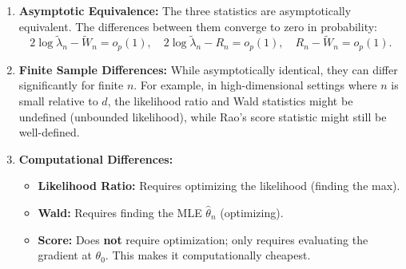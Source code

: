 \begin{remark}
    \leavevmode
\begin{enumerate}
    \item \textbf{Asymptotic Equivalence:} The three statistics are asymptotically equivalent. The differences between them converge to zero in probability:
    \[ 2\log \tilde{\lambda}_n - \widetilde{W}_n = o_p(1), \quad 2\log \tilde{\lambda}_n - R_n = o_p(1), \quad R_n - \widetilde{W}_n = o_p(1). \]
    \item \textbf{Finite Sample Differences:} While asymptotically identical, they can differ significantly for finite $n$. For example, in high-dimensional settings where $n$ is small relative to $d$, the likelihood ratio and Wald statistics might be undefined (unbounded likelihood), while Rao's score statistic might still be well-defined.
    \item \textbf{Computational Differences:}
    \begin{itemize}
        \item \textbf{Likelihood Ratio:} Requires optimizing the likelihood (finding the max).
        \item \textbf{Wald:} Requires finding the MLE $\hat{\theta}_n$ (optimizing).
        \item \textbf{Score:} Does \textbf{not} require optimization; only requires evaluating the gradient at $\theta_0$. This makes it computationally cheapest.
    \end{itemize}
\end{enumerate}
\end{remark}

